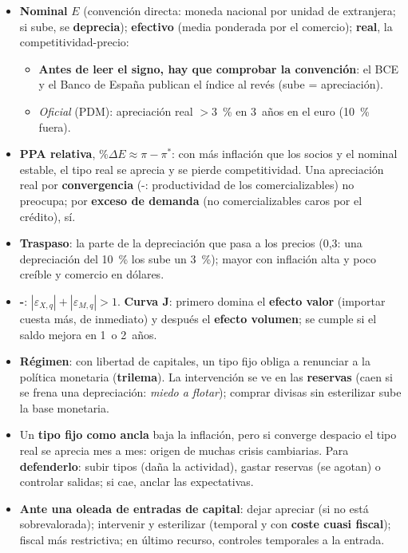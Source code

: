 \documentclass{article}
\begin{document}
\begin{columnas}
\begin{itemize}[itemsep=1.5pt]
\item \textbf{Nominal} $E$ (convención directa: moneda nacional por unidad de extranjera; si sube, se \textbf{deprecia}); \textbf{efectivo} (media ponderada por el comercio); \textbf{real}, la competitividad-precio:
  \begin{itemize}
  \item \textbf{Antes de leer el signo, hay que comprobar la convención}: el BCE y el Banco de España publican el índice al revés (sube = apreciación).
  \item \emph{Oficial} (PDM): apreciación real $>3$~\% en 3~años en el euro (10~\% fuera).
  \end{itemize}
\item \textbf{PPA relativa}, $\%\Delta E\approx\pi-\pi^*$: con más inflación que los socios y el nominal estable, el tipo real se aprecia y se pierde competitividad. Una apreciación real por \textbf{convergencia} (-: productividad de los comercializables) no preocupa; por \textbf{exceso de demanda} (no comercializables caros por el crédito), sí.
\item \textbf{Traspaso}: la parte de la depreciación que pasa a los precios (0,3: una depreciación del 10~\% los sube un 3~\%); mayor con inflación alta y poco creíble y comercio en dólares.
\item \textbf{-}: $|\varepsilon_{X,q}|+|\varepsilon_{M,q}|>1$. \textbf{Curva J}: primero domina el \textbf{efecto valor} (importar cuesta más, de inmediato) y después el \textbf{efecto volumen}; se cumple si el saldo mejora en 1~o 2~años.
\end{itemize}
\begin{itemize}[itemsep=1.5pt]
\item \textbf{Régimen}: con libertad de capitales, un tipo fijo obliga a renunciar a la política monetaria (\textbf{trilema}). La intervención se ve en las \textbf{reservas} (caen si se frena una depreciación: \emph{miedo a flotar}); comprar divisas sin esterilizar sube la base monetaria.
\item Un \textbf{tipo fijo como ancla} baja la inflación, pero si converge despacio el tipo real se aprecia mes a mes: origen de muchas crisis cambiarias. Para \textbf{defenderlo}: subir tipos (daña la actividad), gastar reservas (se agotan) o controlar salidas; si cae, anclar las expectativas.
\item \textbf{Ante una oleada de entradas de capital}: dejar apreciar (si no está sobrevalorada); intervenir y esterilizar (temporal y con \textbf{coste cuasi fiscal}); fiscal más restrictiva; en último recurso, controles temporales a la entrada.
\end{itemize}


\end{columnas}
\end{document}
